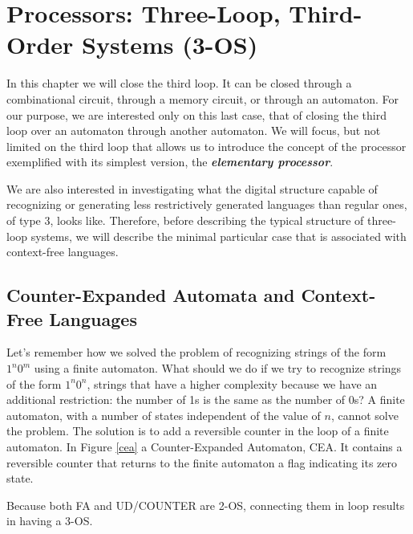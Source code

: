 \chapter{Processors: Three-Loop, Third-Order Systems (3-OS)}\label{lect4}
\localtoc


In this chapter we will  close the third loop. It can be closed through a combinational circuit, through a memory circuit, or through an automaton. For our purpose, we are interested only on this last case, that of closing the third loop over an automaton through another automaton. We will focus, but not limited  on the third loop that allows us to introduce the concept of the processor exemplified with its simplest version, the {\bf {\em  elementary processor}}.  

We are also interested in investigating what the digital structure capable of recognizing or generating less restrictively generated languages ​​than regular ones, of type 3, looks like. Therefore, before describing the typical structure of three-loop systems, we will describe the minimal particular case that is associated with context-free languages.

\section{Counter-Expanded Automata and Context-Free Languages}

Let's remember how we solved the problem of recognizing strings of the form $1^n0^m$ using a finite automaton. What should we do if we try to recognize strings of the form $1^n0^n$, strings that have a higher complexity because we have an additional restriction: the number of 1s is the same as the number of 0s? A finite automaton, with a number of states independent of the value of $n$, cannot solve the problem. The solution is to add a reversible counter in the loop of a finite automaton. In Figure \ref{cea} a Counter-Expanded Automaton, CEA. It contains a reversible counter  that returns to the finite automaton  a flag indicating its zero state.


Because both FA and UD/COUNTER are 2-OS, connecting them in loop results in having a 3-OS.

